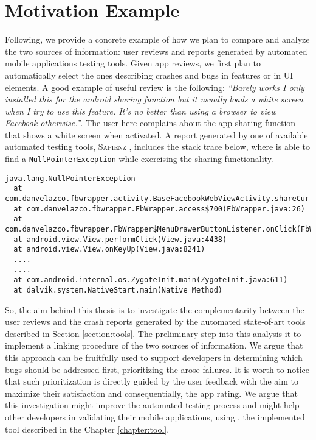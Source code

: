 \section{Motivation Example}
Following, we provide a concrete example of how we plan to compare and analyze the two sources of information: user reviews and reports generated by automated mobile applications testing tools. Given app reviews, we first plan to automatically select the ones describing crashes and bugs in features or in UI elements.
A good example of useful review is the following: 
\smallbreak
\emph{\small``Barely works I only installed this for the android sharing function but it usually loads a white screen when I try to use this feature. It's no better than using a browser to view Facebook otherwise.''}. 
\smallbreak
The user here complains about the app sharing function that shows a white screen when activated. A report generated by one of available automated testing tools, \textsc{Sapienz} \cite{sapienz}, includes the stack trace below, where \sapienz is able to find a \texttt{NullPointerException} while exercising the sharing functionality. 
\smallbreak
\begin{lstlisting}[basicstyle=\fontsize{6}{8}\ttfamily]
java.lang.NullPointerException
  at com.danvelazco.fbwrapper.activity.BaseFacebookWebViewActivity.shareCurrentPage(BaseFacebookWebViewActivity.java:418)
  at com.danvelazco.fbwrapper.FbWrapper.access$700(FbWrapper.java:26)
  at com.danvelazco.fbwrapper.FbWrapper$MenuDrawerButtonListener.onClick(FbWrapper.java:376)
  at android.view.View.performClick(View.java:4438)
  at android.view.View.onKeyUp(View.java:8241)
  ....
  ....
  at com.android.internal.os.ZygoteInit.main(ZygoteInit.java:611)
  at dalvik.system.NativeStart.main(Native Method)
\end{lstlisting}
\smallbreak
So, the aim behind this thesis is to investigate the complementarity between the user reviews and the crash reports generated by the automated state-of-art tools described in Section \ref{section:tools}. 
The preliminary step into this analysis it to implement a linking procedure of the two sources of information. We argue that this approach can be fruitfully used to support developers in determining which bugs should be addressed first, prioritizing the arose failures. It is worth to notice that such prioritization is directly guided by the user feedback with the aim to maximize their satisfaction and consequentially, the app rating.
We argue that this investigation might improve the automated testing process and might help other developers in validating their mobile applications, using \toolname, the implemented tool described in the Chapter \ref{chapter:tool}.

